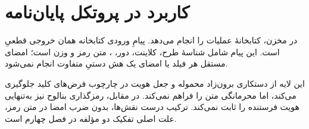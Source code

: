 \section{کاربرد در پروتکل پایان‌نامه}
در مخزن، کتابخانۀ  عملیات  را انجام می‌دهد. پیامِ ورودی کتابخانه همان خروجی قطعیِ  است. این پیام شامل شناسۀ طرح، کلاینت، دور، ، متن رمز و وزن است؛ امضای مستقل هر فیلد یا امضای یک هش دستیِ متفاوت انجام نمی‌شود.

این لایه از دستکاری برون‌زاد محموله و جعل هویت در چارچوب فرض‌های کلید جلوگیری می‌کند، اما محرمانگی متن را فراهم نمی‌کند. در مقابل، رمزگذاری بنالوح نیز به‌تنهایی هویت فرستنده را ثابت نمی‌کند. ترکیب درست نقش‌ها، بدون ضرب امضا در متن رمز، علت اصلی تفکیک دو مؤلفه در فصل چهارم است.
